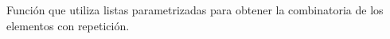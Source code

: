 Función que utiliza listas parametrizadas para obtener la combinatoria de los elementos con repetición.